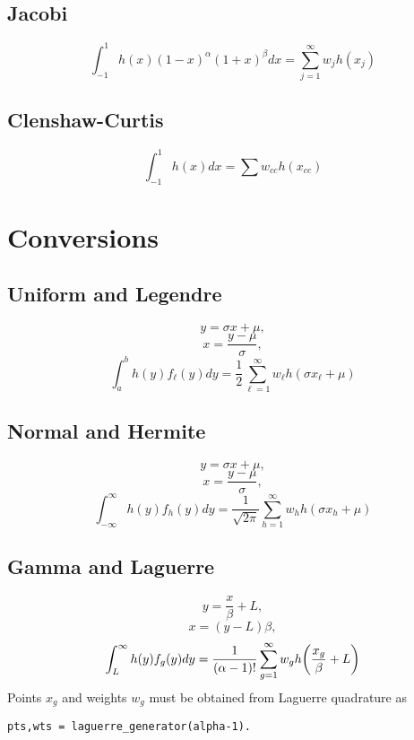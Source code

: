 \documentclass[11pt]{article}
\begin{document}
\subsection{Jacobi}
\begin{equation}
\int_{-1}^1 h(x)(1-x)^\alpha (1+x)^\beta dx = \sum_{j=1}^\infty w_j h(x_j)
\end{equation}

\subsection{Clenshaw-Curtis}
\begin{equation}
\int_{-1}^1 h(x)dx = \sum w_{cc} h(x_{cc})
\end{equation}

\section{Conversions}
\subsection{Uniform and Legendre}
\begin{equation}
y = \sigma x+\mu,
\end{equation}
\begin{equation}
x = \frac{y-\mu}{\sigma},
\end{equation}
\begin{equation}
\int_a^b h(y)f_\ell(y)dy =\frac{1}{2} \sum_{\ell=1}^\infty w_\ell h(\sigma x_\ell+\mu)
\end{equation}

\subsection{Normal and Hermite}
\begin{equation}
y = \sigma x+\mu,
\end{equation}
\begin{equation}
x = \frac{y-\mu}{\sigma},
\end{equation}
\begin{equation}
\int_{-\infty}^\infty h(y)f_h(y)dy =\frac{1}{\sqrt{2\pi}} \sum_{h=1}^\infty w_h h(\sigma x_h+\mu)
\end{equation}

\subsection{Gamma and Laguerre}
\begin{equation}
y = \frac{x}{\beta}+L,
\end{equation}
\begin{equation}
x = (y-L)\beta,
\end{equation}
\begin{equation}
\int_{L}^\infty h(y)f_g(y)dy =\frac{1}{(\alpha-1)!} \sum_{g=1}^\infty w_g h\qty(\frac{x_g}{\beta}+L)
\end{equation}
Points $x_g$ and weights $w_g$ must be obtained from Laguerre quadrature as
\begin{verbatim}
pts,wts = laguerre_generator(alpha-1).
\end{verbatim}
\end{document}
